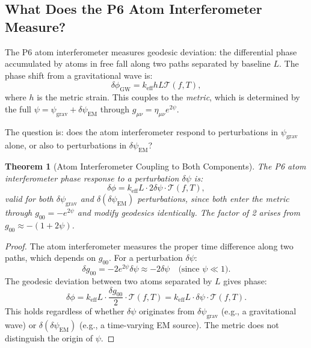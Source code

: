 \documentclass[11pt]{article}
\newtheorem{theorem}{Theorem}[section]
\theoremstyle{definition}
\theoremstyle{remark}
\newcommand{\psigrav}{\psi_{\mathrm{grav}}}
\newcommand{\dpsiem}{\delta\psi_{\mathrm{EM}}}
\begin{document}
\subsection{What Does the P6 Atom Interferometer Measure?}

The P6 atom interferometer measures geodesic deviation: the differential
phase accumulated by atoms in free fall along two paths separated by
baseline $L$. The phase shift from a gravitational wave is:
\begin{equation}
\delta\phi_{\mathrm{GW}} = k_{\mathrm{eff}} h L \mathcal{T}(f,T),
\label{eq:phase-GW}
\end{equation}
where $h$ is the metric strain. This couples to the \emph{metric}, which
is determined by the full $\psi = \psigrav + \dpsiem$ through
$g_{\mu\nu} = \eta_{\mu\nu}e^{2\psi}$.

The question is: does the atom interferometer respond to perturbations
in $\psigrav$ alone, or also to perturbations in $\dpsiem$?

\begin{theorem}[Atom Interferometer Coupling to Both Components]
\label{thm:AI-coupling}
The P6 atom interferometer phase response to a perturbation $\delta\psi$
is:
\begin{equation}
\delta\phi = k_{\mathrm{eff}} L \cdot 2\delta\psi \cdot \mathcal{T}(f,T),
\label{eq:phase-psi}
\end{equation}
valid for both $\delta\psigrav$ and $\delta(\dpsiem)$ perturbations, since
both enter the metric through $g_{00} = -e^{2\psi}$ and modify geodesics
identically. The factor of 2 arises from $g_{00} \approx -(1 + 2\psi)$.
\end{theorem}

\begin{proof}
The atom interferometer measures the proper time difference along two
paths, which depends on $g_{00}$. For a perturbation $\delta\psi$:
\begin{equation}
\delta g_{00} = -2e^{2\psi}\delta\psi \approx -2\delta\psi
\quad\text{(since $\psi \ll 1$)}.
\end{equation}
The geodesic deviation between two atoms separated by $L$ gives phase:
\begin{equation}
\delta\phi = k_{\mathrm{eff}} L \cdot \frac{\delta g_{00}}{2}
\cdot \mathcal{T}(f,T) = k_{\mathrm{eff}} L \cdot \delta\psi
\cdot \mathcal{T}(f,T).
\end{equation}
This holds regardless of whether $\delta\psi$ originates from
$\delta\psigrav$ (e.g., a gravitational wave) or $\delta(\dpsiem)$
(e.g., a time-varying EM source). The metric does not distinguish the
origin of $\psi$.
\end{proof}
\end{document}
